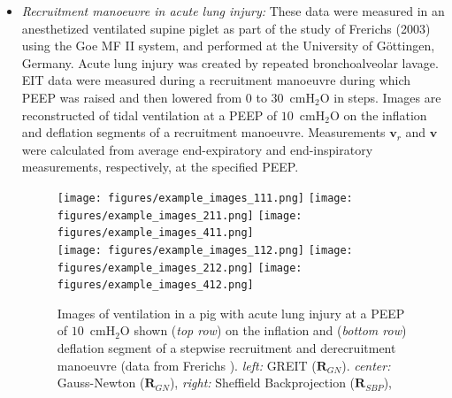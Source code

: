 \documentclass[12pt]{iopart}
\newcommand{\vB}{\mbox{$\mathbf{v}$}}
\newcommand{\RB}{\mbox{$\mathbf{R}$}}
\begin{document}
\begin{itemize}
%
%
\item
{\em Recruitment manoeuvre in acute lung injury:}
These data were measured in an anesthetized
ventilated supine piglet as part of the study of
Frerichs \etal  (2003) using the 
Goe MF II system, and performed at the
University of G\"ottingen, Germany. Acute lung injury
was created by repeated
bronchoalveolar lavage. EIT data were
measured during a recruitment manoeuvre
during which PEEP was raised and then
lowered from 0 to 30~cmH$_2$O in steps. 
Images are reconstructed of tidal ventilation
at a PEEP of $10$~cmH$_2$O on the inflation
and deflation segments of a recruitment manoeuvre.
Measurements $\vB_r$ and $\vB$
were calculated from average end-expiratory
and end-inspiratory measurements, respectively,
 at the specified
PEEP.

\begin{figure}[bhtp]
\begin{center}
\texttt{[image: figures/example\_images\_111.png]}
\texttt{[image: figures/example\_images\_211.png]}
\texttt{[image: figures/example\_images\_411.png]}
\\
\texttt{[image: figures/example\_images\_112.png]}
\texttt{[image: figures/example\_images\_212.png]}
\texttt{[image: figures/example\_images\_412.png]}
\caption{
\label{fig:Frerichs03images}
Images of ventilation in a pig with
acute lung injury 
at a PEEP of $10$~cmH$_2$O shown ({\em top row})
on the inflation and ({\em bottom row})
deflation segment of a stepwise recruitment and derecruitment manoeuvre 
(data from Frerichs ).
{\em left:} GREIT ($\RB_{GN}$).
{\em center:} Gauss-Newton ($\RB_{GN}$),
{\em right:} Sheffield Backprojection ($\RB_{SBP}$),
}
\end{center}
\end{figure}


\end{itemize}
\end{document}
